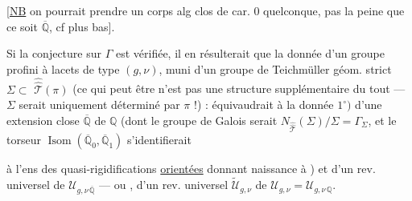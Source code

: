 [\uline{NB} on pourrait prendre un corps alg clos de car. $0$ quelconque, pas la peine que ce soit  $\overline{\mathbb Q}$, cf plus bas].


Si la conjecture sur $\Gamma$ est vérifiée, il en résulterait que la donnée d'un groupe  profini à lacets \inserted{$\pi$} de type $(g,\nu)$, muni d'un groupe de Teichmüller géom. strict $\Sigma\subset$ $\widehat{\widehat{\mathcal T}}(\pi)$ (ce qui peut être n'est pas une structure supplémentaire du tout --- $\Sigma$ serait uniquement déterminé par $\pi$ !) : équivaudrait à la donnée $1^{\circ})$ d'une extension  close $\overline{\mathbb Q}$ de $\mathbb Q$ (dont le groupe de Galois serait $N_{\widehat{\widehat{\mathcal T}}}(\Sigma)/\Sigma=\Gamma_\Sigma$, et le torseur $\operatorname{Isom}(\overline{\mathbb Q}_0,\overline{\mathbb Q}_1)$ s'identifierait

à l'ens  des quasi-rigidifications  \uline{orientées} donnant naissance à ) et d'un rev. universel de $\mathcal U_{g,\nu\,\overline{\mathbb Q}}$ --- ou , d'un rev. universel $\widetilde{\mathcal U}_{g,\nu}$ de $\mathcal U_{g,\nu}=\mathcal U_{g,\nu\,\mathbb Q}$.


